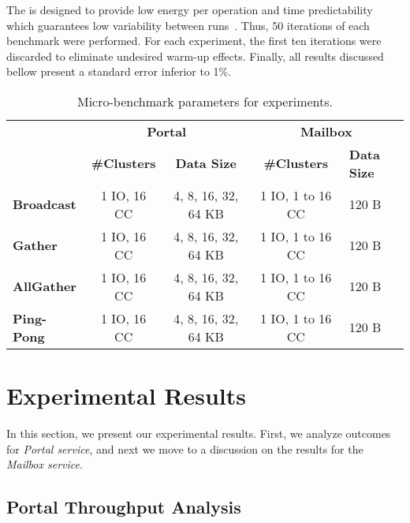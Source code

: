 			The \mppa is designed to provide low energy per operation and time
			predictability which guarantees low variability between runs~\cite{DeDinechin2013-1}.
			Thus, 50 iterations of each benchmark were performed. For each
			experiment, the first ten iterations were discarded to eliminate
			undesired warm-up effects. Finally, all results discussed bellow
			present a standard error inferior to 1\%.

			\begin{table}[!bh]
				\centering%
				\caption{Micro-benchmark parameters for experiments.}%
				\label{tab:benchmarks-parameters}%

				\begin{tabular}{l|c|c|c|l|}
					\cline{2-5}
															 & \multicolumn{2}{c|}{\textbf{Portal}}      & \multicolumn{2}{c|}{\textbf{Mailbox}}    \\ \cline{2-5}
															 & \textbf{\#Clusters} & \textbf{Data Size}  & \textbf{\#Clusters} & \textbf{Data Size} \\ \hline
					\multicolumn{1}{|l|}{\textbf{Broadcast}} & 1 IO, 16 CC         & 4, 8, 16, 32, 64 KB & 1 IO, 1 to 16 CC    & 120 B              \\ \hline
					\multicolumn{1}{|l|}{\textbf{Gather}}    & 1 IO, 16 CC         & 4, 8, 16, 32, 64 KB & 1 IO, 1 to 16 CC    & 120 B              \\ \hline
					\multicolumn{1}{|l|}{\textbf{AllGather}} & 1 IO, 16 CC         & 4, 8, 16, 32, 64 KB & 1 IO, 1 to 16 CC    & 120 B              \\ \hline
					\multicolumn{1}{|l|}{\textbf{Ping-Pong}} & 1 IO, 16 CC         & 4, 8, 16, 32, 64 KB & 1 IO, 1 to 16 CC    & 120 B              \\ \hline
				\end{tabular}

			\end{table}

	\section{Experimental Results}
	\label{sec.experimental-results}

		In this section, we present our experimental results. First, we
		analyze outcomes for \textit{Portal service}, and next we move to
		a discussion on the results for the \textit{Mailbox service}.

		\subsection{Portal Throughput Analysis}

